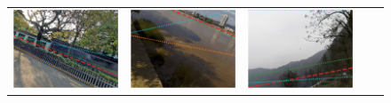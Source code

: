 \begin{figure}
\begin{tabular}{cccc|c}
\includegraphics[width=\exampleresultswidth\linewidth]{figures/method/results/pano_addqflfuthjcbf_jpg-3.png} &
\includegraphics[width=\exampleresultswidth\linewidth]{figures/method/results/pano_adqwuqgahcnffm_jpg-0.png} &
\includegraphics[width=\exampleresultswidth\linewidth]{figures/method/failures/pano_adduzncvdbrnsc_jpg-5.png} \\

\end{tabular}
\end{figure}
